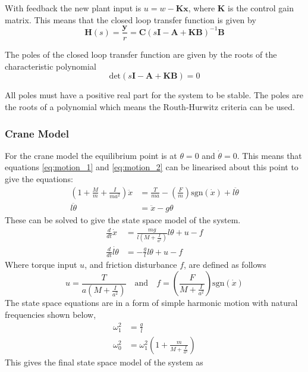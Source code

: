 \documentclass{article}
\begin{document}
With feedback the new plant input is $u = w - \mathbf{Kx}$, where $\mathbf{K}$ is the control gain matrix.
This means that the closed loop transfer function is given by
\begin{equation}
  \mathbf{H}(s) = \frac{\mathbf{y}}{r} = \mathbf{C} (s\mathbf{I} - \mathbf{A} + \mathbf{KB}) ^{-1} \mathbf{B}
  \label{eq:closed_loop_tf}
\end{equation}

The poles of the closed loop transfer function are given by the roots of the characteristic polynomial
\begin{equation}
  \text{det} \left( s\mathbf{I} - \mathbf{A} + \mathbf{KB} \right) = 0
  \label{eq:det_poly}
\end{equation}

All poles must have a positive real part for the system to be stable.
The poles are the roots of a polynomial which means the Routh-Hurwitz criteria can be used.

\subsubsection{Crane Model}

For the crane model the equilibrium point is at $\theta = 0$ and $\dot{\theta} = 0$.
This means that equations \ref{eq:motion_1} and \ref{eq:motion_2} can be linearised about this point to give the equations:
\begin{align}
  \left( 1 + \frac{M}{m} + \frac{I}{ma^2} \right) \ddot{x} &= \frac{T}{ma} - \left(\frac{F}{m}\right)\text{sgn}(\dot{x}) + l \ddot{\theta} \label{eq:crane_motion_1} \\
  l \ddot{\theta} &= \ddot{x} - g\theta \label{eq:crane_motion_2}
\end{align}
These can be solved to give the state space model of the system.
\begin{align}
  \frac{d}{dt} \dot{x} &= \frac{mg}{l\left(M+\frac{I}{a^2}\right)} l\theta + u - f \\
  \frac{d}{dt} \dot{l\theta} &= -\frac{g}{l}l\theta + u - f
\end{align}
Where torque input $u$, and friction disturbance $f$, are defined as follows
\begin{equation}
  u = \frac{T}{a\left(M+\frac{I}{a^2}\right)} \quad \text{and} \quad f = \left(\frac{F}{M + \frac{I}{a^2}} \right) \text{sgn} (\dot{x})
  \label{eq:ss_system_inputs}
\end{equation}
The state space equations are in a form of simple harmonic motion with natural frequencies shown below,
\begin{align}
  \omega_1^2 &= \frac{g}{l} \\
  \omega_0^2 &= \omega_1^2\left(1 + \frac{m}{M+\frac{I}{a^2}} \right)
\end{align}
This gives the final state space model of the system as
\end{document}
